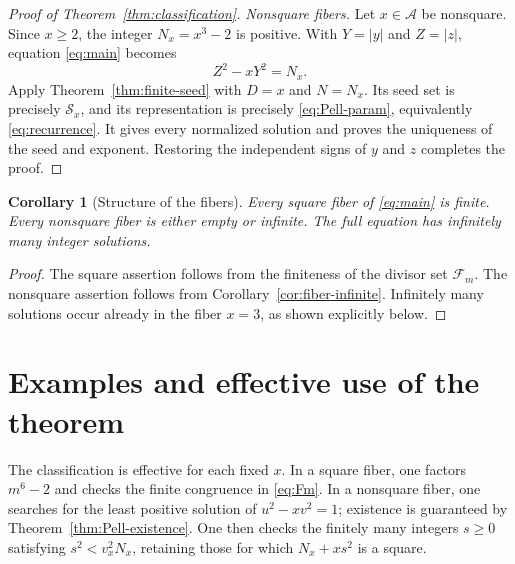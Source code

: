 \documentclass[11pt,a4paper]{amsart}
\newtheorem{corollary}[theorem]{Corollary}
\theoremstyle{definition}
\newcommand{\Acal}{\mathcal A}
\newcommand{\Fcal}{\mathcal F}
\newcommand{\Scal}{\mathcal S}
\numberwithin{equation}{section}
\begin{document}
\begin{proof}[Proof of Theorem~\ref{thm:classification}]
\smallskip
\noindent\emph{Nonsquare fibers.}
Let \(x\in\Acal\) be nonsquare.  Since \(x\geq2\), the integer
\(N_x=x^3-2\) is positive.  With \(Y=|y|\) and \(Z=|z|\), equation
\eqref{eq:main} becomes
\begin{equation}
 Z^2-xY^2=N_x.
 \label{eq:fiber-generalized-Pell}
\end{equation}
Apply Theorem~\ref{thm:finite-seed} with \(D=x\) and \(N=N_x\).  Its seed set is
precisely \(\Scal_x\), and its representation is precisely
\eqref{eq:Pell-param}, equivalently \eqref{eq:recurrence}.  It gives every normalized
solution and proves the uniqueness of the seed and exponent.  Restoring the
independent signs of \(y\) and \(z\) completes the proof.
\end{proof}

\begin{corollary}[Structure of the fibers]
\label{cor:fibers}
Every square fiber of \eqref{eq:main} is finite.  Every nonsquare fiber is either
empty or infinite.  The full equation has infinitely many integer solutions.
\end{corollary}

\begin{proof}
The square assertion follows from the finiteness of the divisor set
\(\Fcal_m\).  The nonsquare assertion follows from
Corollary~\ref{cor:fiber-infinite}.  Infinitely many solutions occur already in the
fiber \(x=3\), as shown explicitly below.
\end{proof}

\section{Examples and effective use of the theorem}

The classification is effective for each fixed \(x\).  In a square fiber, one
factors \(m^6-2\) and checks the finite congruence in \eqref{eq:Fm}.  In a nonsquare
fiber, one searches for the least positive solution of \(u^2-xv^2=1\); existence is
guaranteed by Theorem~\ref{thm:Pell-existence}.  One then checks the finitely many
integers \(s\geq0\) satisfying \(s^2<v_x^2N_x\), retaining those for which
\(N_x+xs^2\) is a square.
\end{document}
